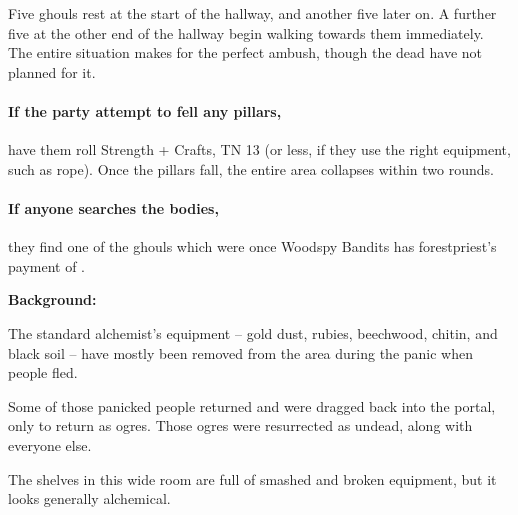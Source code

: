 Five ghouls rest at the start of the hallway, and another five later on.
A further five at the other end of the hallway begin walking towards them immediately.
The entire situation makes for the perfect ambush, though the dead have not planned for it.


\paragraph{If the party attempt to fell any pillars,}
have them roll Strength + Crafts, TN 13 (or less, if they use the right equipment, such as rope).
Once the pillars fall, the entire area collapses within two rounds.

\paragraph{If anyone searches the bodies,}
they find one of the ghouls which were once Woodspy Bandits has \gls{forestpriest}'s payment of \lootMedium.



\textbf{Background:}

The standard alchemist's equipment -- gold dust, rubies, beechwood, chitin, and black soil -- have mostly been removed from the area during the panic when people fled.

Some of those panicked people returned and were dragged back into the portal, only to return as ogres.
Those ogres were resurrected as undead, along with everyone else.

\begin{boxtext}

  The shelves in this wide room are full of smashed and broken equipment, but it looks generally alchemical.

\end{boxtext}


